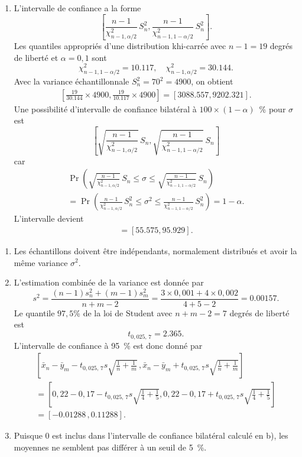 \begin{solution}{5.9}
\begin{enumerate}
\item
L'intervalle de confiance a la forme
$$
\left[\frac{n-1}{\chi^2_{n-1,\alpha/2}} \, S_n^2,\frac{n-1}{\chi^2_{n-1,1-\alpha/2}} \, S_n^2\right].
$$
Les quantiles appropriés d'une distribution khi-carrée avec $n-1=19$ degrés de liberté et $\alpha=0,1$ sont
$$
\chi^2_{n-1,1-\alpha/2} = 10.117, \quad \chi^2_{n-1,\alpha/2} = 30.144.
$$
Avec la variance échantillonnale $S_n^2 = 70^2 = 4900$, on obtient
\begin{align*}
\left[\frac{19}{30.144}\times4900,\frac{19}{10.117}\times4900\right] = [3088.557,9202.321].
\end{align*}
Une possibilité d'intervalle de confiance bilatéral à $100 \times (1-\alpha)$~\% pour $\sigma$ est
$$
\left[\sqrt{\frac{n-1}{\chi^2_{n-1,\alpha/2}}} \, S_n,\sqrt{\frac{n-1}{\chi^2_{n-1,1-\alpha/2}}} \, S_n\right]
$$
car
\begin{multline*}
\Pr\left(\sqrt{\frac{n-1}{\chi^2_{n-1,\alpha/2}}} \, S_n \le \sigma \le \sqrt{\frac{n-1}{\chi^2_{n-1,1-\alpha/2}}} \, S_n \right)\\ = \Pr\left(\frac{n-1}{\chi^2_{n-1,\alpha/2}} \, S_n^2 \le \sigma^2 \le \frac{n-1}{\chi^2_{n-1,1-\alpha/2}} \, S_n^2 \right) = 1-\alpha.
\end{multline*}
L'intervalle devient
\begin{align*}
[\sqrt{3088.557},\sqrt{9202.321}] = [55.575,95.929].
\end{align*}
\end{enumerate}
\end{solution}
\begin{solution}{5.10}
\begin{enumerate}
\item Les échantillons doivent être indépendants, normalement distribués et avoir la même variance $\sigma^2$.

\item L'estimation combinée de la variance est donnée par
$$
s^2 = \frac{(n-1) s_n^2 + (m-1)s_m^2}{n+m-2} = \frac{3\times 0,001 + 4 \times 0,002}{4+5-2} = 0.00157.
$$
Le quantile $97,5$\% de la loi de Student avec $n+m-2=7$ degrés de liberté est
$$
t_{0,025, \, 7} = 2.365.
$$
L'intervalle de confiance à 95~\% est donc donné par
\begin{multline*}
\left[\bar x_n - \bar y_m - t_{0,025, \, 7} s \sqrt{\frac{1}{n} + \frac{1}{m}} \, , \bar x_n - \bar y_m + t_{0,025, \, 7} s \sqrt{\frac{1}{n} + \frac{1}{m}}\right] \\ = \left[0,22 - 0,17 - t_{0,025, \, 7} s \sqrt{\frac{1}{4} + \frac{1}{5}}, 0,22 - 0,17 + t_{0,025, \, 7} s \sqrt{\frac{1}{4} + \frac{1}{5}}\right] \\= [-0.01288 \, ,0.11288].
\end{multline*}

\item Puisque $0$ est inclus dans l'intervalle de confiance bilatéral calculé en b), les moyennes ne semblent pas différer à un seuil de 5~\%.
\end{enumerate}
\end{solution}
